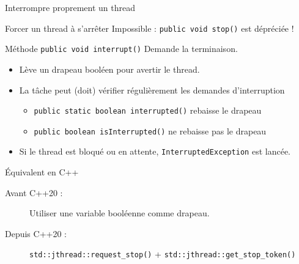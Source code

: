 
\begingroup

\begin{frame}[fragile]{Interrompre proprement un thread}

  \begin{alertblock}{Forcer un thread à s'arrêter}
    Impossible : \lstinline|public void stop()| est dépréciée !
  \end{alertblock}

  \vfill

  \begin{block}{Méthode \lstinline|public void interrupt()|}
    Demande la terminaison.
    \begin{itemize}
    \item Lève un drapeau booléen pour avertir le thread.
    \item La tâche peut (doit) vérifier régulièrement les demandes d'interruption
      \begin{itemize}
      \item \lstinline|public static boolean interrupted()| \hspace{\fill} rebaisse le drapeau
      \item \lstinline|public boolean isInterrupted()|      \hspace{\fill} ne rebaisse pas le drapeau
      \end{itemize}
    \item Si le thread est bloqué ou en attente,  \lstinline|InterruptedException| est lancée.
    \end{itemize}
  \end{block}

  \vfill

  \begin{exampleblock}{Équivalent en C++}
    \begin{description}
    \item[Avant C++20 :] Utiliser une variable booléenne  comme drapeau.
    \item[Depuis C++20 :] \lstinline{std::jthread::request_stop()} + \lstinline{std::jthread::get_stop_token()}
    \end{description}
  \end{exampleblock}

\end{frame}

\endgroup
\endinput
